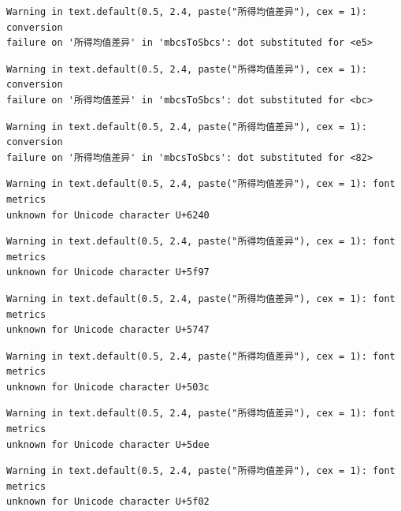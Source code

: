 \documentclass[
  letterpaper,
  DIV=11,
  numbers=noendperiod]{scrreprt}
\begin{document}
\begin{verbatim}
Warning in text.default(0.5, 2.4, paste("所得均值差异"), cex = 1): conversion
failure on '所得均值差异' in 'mbcsToSbcs': dot substituted for <e5>
\end{verbatim}

\begin{verbatim}
Warning in text.default(0.5, 2.4, paste("所得均值差异"), cex = 1): conversion
failure on '所得均值差异' in 'mbcsToSbcs': dot substituted for <bc>
\end{verbatim}

\begin{verbatim}
Warning in text.default(0.5, 2.4, paste("所得均值差异"), cex = 1): conversion
failure on '所得均值差异' in 'mbcsToSbcs': dot substituted for <82>
\end{verbatim}

\begin{verbatim}
Warning in text.default(0.5, 2.4, paste("所得均值差异"), cex = 1): font metrics
unknown for Unicode character U+6240
\end{verbatim}

\begin{verbatim}
Warning in text.default(0.5, 2.4, paste("所得均值差异"), cex = 1): font metrics
unknown for Unicode character U+5f97
\end{verbatim}

\begin{verbatim}
Warning in text.default(0.5, 2.4, paste("所得均值差异"), cex = 1): font metrics
unknown for Unicode character U+5747
\end{verbatim}

\begin{verbatim}
Warning in text.default(0.5, 2.4, paste("所得均值差异"), cex = 1): font metrics
unknown for Unicode character U+503c
\end{verbatim}

\begin{verbatim}
Warning in text.default(0.5, 2.4, paste("所得均值差异"), cex = 1): font metrics
unknown for Unicode character U+5dee
\end{verbatim}

\begin{verbatim}
Warning in text.default(0.5, 2.4, paste("所得均值差异"), cex = 1): font metrics
unknown for Unicode character U+5f02
\end{verbatim}
\end{document}
